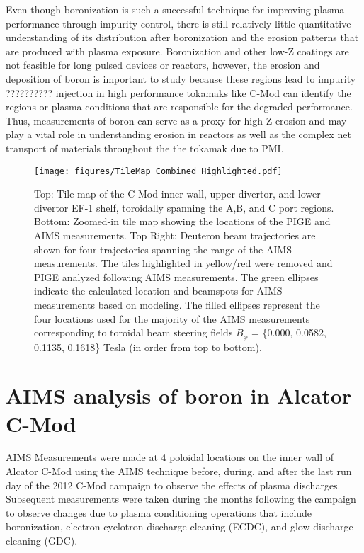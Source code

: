\documentclass[final,3p,times,twocolumn]{elsarticle}
\begin{document}
Even though boronization is such a successful technique for improving plasma performance through impurity control, there is still relatively little quantitative understanding of its distribution after boronization and the erosion patterns that are produced with plasma exposure. Boronization and other low-Z coatings are not feasible for long pulsed devices or reactors, however, the erosion and deposition of boron is important to study because these regions lead to impurity ?????????? injection in high performance tokamaks like C-Mod can identify the regions or plasma conditions that are responsible for the degraded performance.  Thus, measurements of boron can serve as a proxy for high-Z erosion and may play a vital role in understanding erosion in reactors as well as the complex net transport of materials throughout the the tokamak due to PMI.


\begin{figure*}[p]
 \centering
  \texttt{[image: figures/TileMap\_Combined\_Highlighted.pdf]}
 \caption{\small Top: Tile map of the C-Mod inner wall, upper divertor, and lower divertor EF-1 shelf, toroidally spanning the A,B, and C port regions. Bottom: Zoomed-in tile map showing the locations of the PIGE and AIMS measurements. Top Right: Deuteron beam trajectories are shown for four trajectories spanning the range of the AIMS measurements. The tiles highlighted in yellow/red were removed and PIGE analyzed following AIMS measurements.  The green ellipses indicate the calculated location and beamspots for AIMS measurements based on modeling. The filled ellipses represent the four locations used for the majority of the AIMS measurements corresponding to toroidal beam steering fields $B_\phi$ = \{0.000, 0.0582, 0.1135, 0.1618\} Tesla (in order from top to bottom).}
 \label{fig:TileMap0}
\end{figure*}

%

\section{AIMS analysis of boron in Alcator C-Mod}

AIMS Measurements were made at 4 poloidal locations on the inner wall of Alcator C-Mod using the AIMS technique before, during, and after the last run day of the 2012 C-Mod campaign to observe the effects of plasma discharges. Subsequent measurements were taken during the months following the campaign to observe changes due to plasma conditioning operations that include boronization, electron cyclotron discharge cleaning (ECDC), and glow discharge cleaning (GDC).  
\end{document}
